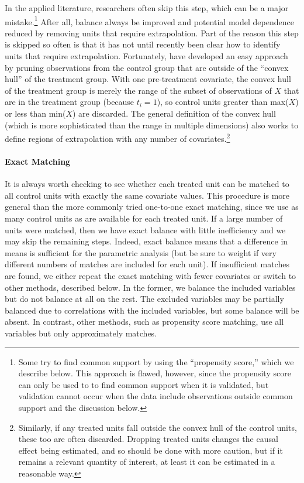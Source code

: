 \documentclass[11pt,titlepage]{article}
\begin{document}
In the applied literature, researchers often skip this step, which can
be a major mistake.\footnote{Some try to find common support by using
  the ``propensity score,'' which we describe below.  This approach is
  flawed, however, since the propensity score can only be used to to
  find common support when it is validated, but validation cannot
  occur when the data include observations outside common support
  \citep[see][]{KinZen06a} and the discussion below.}  After all,
balance always be improved and potential model dependence reduced by
removing units that require extrapolation.  Part of the reason this
step is skipped so often is that it has not until recently been clear
how to identify units that require extrapolation.  Fortunately,
\citet{KinZen06a} have developed an easy approach by pruning
observations from the control group that are outside of the ``convex
hull'' of the treatment group.  With one pre-treatment covariate, the
convex hull of the treatment group is merely the range of the subset
of observations of $X$ that are in the treatment group (because
$t_i=1$), so control units greater than max($X$) or less than min($X$)
are discarded.  The general definition of the convex hull (which is
more sophisticated than the range in multiple dimensions) also works
to define regions of extrapolation with any number of
covariates.\footnote{Similarly, if any treated units fall outside the
  convex hull of the control units, these too are often discarded.
  Dropping treated units changes the causal effect being estimated,
  and so should be done with more caution, but if it remains a
  relevant quantity of interest, at least it can be estimated in a
  reasonable way.}

\paragraph{Exact Matching}  
It is always worth checking to see whether each treated unit can be
matched to all control units with exactly the same covariate values.
This procedure is more general than the more commonly tried one-to-one
exact matching, since we use as many control units as are available
for each treated unit.  If a large number of units were matched, then
we have exact balance with little inefficiency and we may skip the
remaining steps.  Indeed, exact balance means that a difference in
means is sufficient for the parametric analysis (but be sure to weight
if very different numbers of matches are included for each unit).  If
insufficient matches are found, we either repeat the exact matching
with fewer covariates or switch to other methods, described below.  In
the former, we balance the included variables but do not balance at
all on the rest.  The excluded variables may be partially balanced due
to correlations with the included variables, but some balance will be
absent.  In contrast, other methods, such as propensity score
matching, use all variables but only approximately matches.
\end{document}
